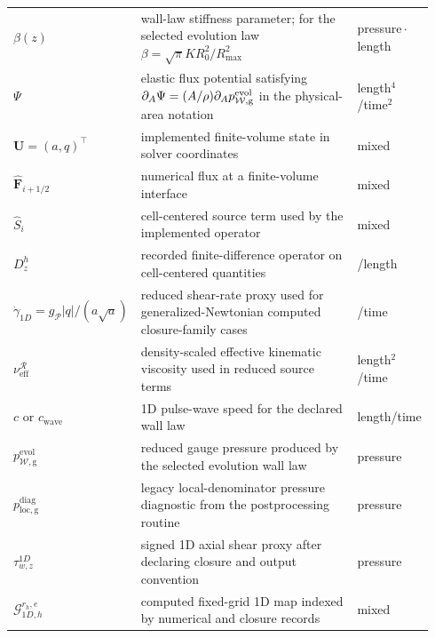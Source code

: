 \begin{minipage}[t]{\textwidth}
\begin{compactacronymtables}
\begin{tabular}{@{}>{\raggedright\arraybackslash}p{0.24\linewidth}
        >{\raggedright\arraybackslash}p{0.56\linewidth}
        >{\raggedright\arraybackslash}p{0.14\linewidth}@{}}
        $\beta(z)$ & wall-law stiffness parameter; for the selected evolution law $\beta=\sqrt\pi K R_0^2/R_{\max}^2$ & pressure\,$\cdot$\,length \\
        $\Psi$ & elastic flux potential satisfying $\partial_A\Psi=(A/\rho)\partial_Ap_{\mathcal W,\mathrm g}^{\mathrm{evol}}$ in the physical-area notation & length$^4$/time$^2$ \\
        $\mathbf U=(a,q)^\top$ & implemented finite-volume state in solver coordinates & mixed \\
        $\widehat{\mathbf F}_{i+1/2}$ & numerical flux at a finite-volume interface & mixed \\
        $\widehat S_i$ & cell-centered source term used by the implemented operator & mixed \\
        $D_z^h$ & recorded finite-difference operator on cell-centered quantities & 1/length \\
        $\dot\gamma_{1D}=g_{\mathcal P}|q|/(a\sqrt a)$ & reduced shear-rate proxy used for generalized-Newtonian computed closure-family cases & 1/time \\
        $\nu_{\mathrm{eff}}^{\mathcal R}$ & density-scaled effective kinematic viscosity used in reduced source terms & length$^2$/time \\
        $c$ or $c_{\mathrm{wave}}$ & 1D pulse-wave speed for the declared wall law & length/time \\
        $p_{\mathcal W,\mathrm g}^{\mathrm{evol}}$ & reduced gauge pressure produced by the selected evolution wall law & pressure \\
        $p_{\mathrm{loc},\mathrm g}^{\mathrm{diag}}$ & legacy local-denominator pressure diagnostic from the postprocessing routine & pressure \\
        $\tau_{w,z}^{1D}$ & signed 1D axial shear proxy after declaring closure and output convention & pressure \\
        $\mathcal G_{1D,h}^{r_h,e}$ & computed fixed-grid 1D map indexed by numerical and closure records & mixed \\
        \bottomrule
\end{tabular}
\end{compactacronymtables}
\end{minipage}


